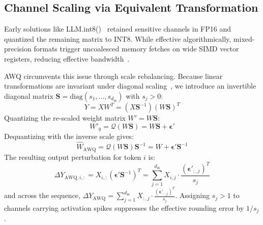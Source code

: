 \documentclass[runningheads,oribibl]{llncs}
\begin{document}
\subsection{Channel Scaling via Equivalent Transformation}
Early solutions like LLM.int8()~\cite{dettmers2022llmint8} retained sensitive channels in FP16 and quantized the remaining matrix to INT8. While effective algorithmically, mixed-precision formats trigger uncoalesced memory fetches on wide SIMD vector registers, reducing effective bandwidth~\cite{park2022nuqmm}.

AWQ circumvents this issue through scale rebalancing. Because linear transformations are invariant under diagonal scaling~\cite{xiao2023smoothquant}, we introduce an invertible diagonal matrix $\mathbf{S} = \text{diag}(s_1, \dots, s_{d_{\text{in}}})$ with $s_j > 0$:
\begin{equation}
Y = X W^T = \left( X \mathbf{S}^{-1} \right) \left( W \mathbf{S} \right)^T
\end{equation}
Quantizing the re-scaled weight matrix $W' = W \mathbf{S}$:
\begin{equation}
W'_q = \mathcal{Q}\left( W \mathbf{S} \right) = W \mathbf{S} + \boldsymbol{\epsilon}'
\end{equation}
Dequantizing with the inverse scale gives:
\begin{equation}
\widehat{W}_{\text{AWQ}} = \mathcal{Q}\left( W \mathbf{S} \right) \mathbf{S}^{-1} = W + \boldsymbol{\epsilon}' \mathbf{S}^{-1}
\end{equation}
The resulting output perturbation for token $i$ is:
\begin{equation}
\Delta Y_{\text{AWQ}, i, :} = X_{i, :} \left( \boldsymbol{\epsilon}' \mathbf{S}^{-1} \right)^T = \sum_{j=1}^{d_{\text{in}}} X_{i, j} \cdot \frac{(\boldsymbol{\epsilon}'_{:, j})^T}{s_j}
\end{equation}
and across the sequence, $\Delta Y_{\text{AWQ}} = \sum_{j=1}^{d_{\text{in}}} X_{:, j} \cdot \frac{(\boldsymbol{\epsilon}'_{:, j})^T}{s_j}$. Assigning $s_j > 1$ to channels carrying activation spikes suppresses the effective rounding error by $1/s_j$.
\end{document}
